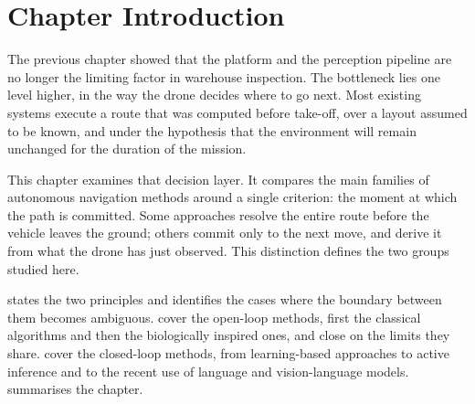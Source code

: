 \section{Chapter Introduction}%
\label{sec:nav:intro}

The previous chapter showed that the platform and the perception pipeline are no
longer the limiting factor in warehouse inspection. The bottleneck lies one level
higher, in the way the drone decides where to go next. Most existing systems
execute a route that was computed before take-off, over a layout assumed to be
known, and under the hypothesis that the environment will remain unchanged for
the duration of the mission.

This chapter examines that decision layer. It compares the main families of
autonomous navigation methods around a single criterion: the moment at which the
path is committed. Some approaches resolve the entire route before the vehicle
leaves the ground; others commit only to the next move, and derive it from what
the drone has just observed. This distinction defines the two groups studied
here.

 states the two principles and identifies the cases
where the boundary between them becomes ambiguous.
 cover the
open-loop methods, first the classical algorithms and then the biologically
inspired ones, and close on the limits they share.
 cover the closed-loop
methods, from learning-based approaches to active inference and to the recent use
of language and vision-language models.  summarises the
chapter.
